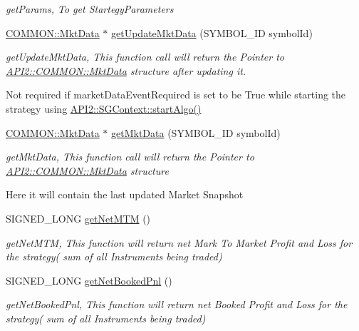 \begin{DoxyCompactItemize}
\begin{DoxyCompactList}\small\item\em get\-Params, To get Startegy\-Parameters \end{DoxyCompactList}\item 
\hyperlink{class_a_p_i2_1_1_c_o_m_m_o_n_1_1_mkt_data}{C\-O\-M\-M\-O\-N\-::\-Mkt\-Data} $\ast$ \hyperlink{class_a_p_i2_1_1_s_g_context_a976152e42455f8ea52f2bdee052f3c39}{get\-Update\-Mkt\-Data} (S\-Y\-M\-B\-O\-L\-\_\-\-I\-D symbol\-Id)
\begin{DoxyCompactList}\small\item\em get\-Update\-Mkt\-Data, This function call will return the Pointer to \hyperlink{class_a_p_i2_1_1_c_o_m_m_o_n_1_1_mkt_data}{A\-P\-I2\-::\-C\-O\-M\-M\-O\-N\-::\-Mkt\-Data} structure after updating it.\par
 Not required if market\-Data\-Event\-Required is set to be True while starting the strategy using \hyperlink{class_a_p_i2_1_1_s_g_context_a44cb008b60a1e0a376c6d7909bd11de2}{A\-P\-I2\-::\-S\-G\-Context\-::start\-Algo()} \end{DoxyCompactList}\item 
\hyperlink{class_a_p_i2_1_1_c_o_m_m_o_n_1_1_mkt_data}{C\-O\-M\-M\-O\-N\-::\-Mkt\-Data} $\ast$ \hyperlink{class_a_p_i2_1_1_s_g_context_ae699404b321162a301789572fc0ebabe}{get\-Mkt\-Data} (S\-Y\-M\-B\-O\-L\-\_\-\-I\-D symbol\-Id)
\begin{DoxyCompactList}\small\item\em get\-Mkt\-Data, This function call will return the Pointer to \hyperlink{class_a_p_i2_1_1_c_o_m_m_o_n_1_1_mkt_data}{A\-P\-I2\-::\-C\-O\-M\-M\-O\-N\-::\-Mkt\-Data} structure \par
 Here it will contain the last updated Market Snapshot \end{DoxyCompactList}\item 
S\-I\-G\-N\-E\-D\-\_\-\-L\-O\-N\-G \hyperlink{class_a_p_i2_1_1_s_g_context_a5143f1432d2b423420f6405a934ea0be}{get\-Net\-M\-T\-M} ()
\begin{DoxyCompactList}\small\item\em get\-Net\-M\-T\-M, This function will return net Mark To Market Profit and Loss for the strategy( sum of all Instruments being traded) \end{DoxyCompactList}\item 
S\-I\-G\-N\-E\-D\-\_\-\-L\-O\-N\-G \hyperlink{class_a_p_i2_1_1_s_g_context_af6870dd712538b752eab69b935c7583b}{get\-Net\-Booked\-Pnl} ()
\begin{DoxyCompactList}\small\item\em get\-Net\-Booked\-Pnl, This function will return net Booked Profit and Loss for the strategy( sum of all Instruments being traded) \end{DoxyCompactList}\item 

\end{DoxyCompactItemize}
